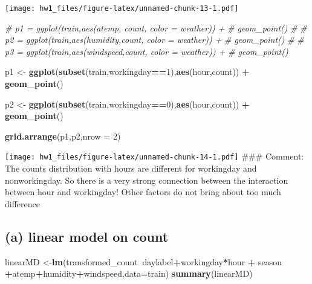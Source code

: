 \documentclass[]{article}
\newenvironment{Shaded}{\begin{snugshade}}{\end{snugshade}}
\newcommand{\KeywordTok}[1]{\textcolor[rgb]{0.13,0.29,0.53}{\textbf{#1}}}
\newcommand{\DataTypeTok}[1]{\textcolor[rgb]{0.13,0.29,0.53}{#1}}
\newcommand{\DecValTok}[1]{\textcolor[rgb]{0.00,0.00,0.81}{#1}}
\newcommand{\StringTok}[1]{\textcolor[rgb]{0.31,0.60,0.02}{#1}}
\newcommand{\CommentTok}[1]{\textcolor[rgb]{0.56,0.35,0.01}{\textit{#1}}}
\newcommand{\OperatorTok}[1]{\textcolor[rgb]{0.81,0.36,0.00}{\textbf{#1}}}
\newcommand{\NormalTok}[1]{#1}
\begin{document}
\texttt{[image: hw1\_files/figure-latex/unnamed-chunk-13-1.pdf]}

\begin{Shaded}
\begin{Highlighting}[]
\CommentTok{# p1 = ggplot(train,aes(atemp, count, color = weather)) + }
\CommentTok{#   geom_point()}
\CommentTok{# }
\CommentTok{# p2 = ggplot(train,aes(humidity,count,  color = weather)) + }
\CommentTok{#   geom_point()}
\CommentTok{# }
\CommentTok{# p3 = ggplot(train,aes(windspeed,count,  color = weather)) + }
\CommentTok{#   geom_point()}

\NormalTok{p1 <-}\StringTok{ }\KeywordTok{ggplot}\NormalTok{(}\KeywordTok{subset}\NormalTok{(train,workingday}\OperatorTok{==}\DecValTok{1}\NormalTok{),}\KeywordTok{aes}\NormalTok{(hour,count)) }\OperatorTok{+}\StringTok{ }
\StringTok{  }\KeywordTok{geom_point}\NormalTok{()}

\NormalTok{p2 <-}\StringTok{ }\KeywordTok{ggplot}\NormalTok{(}\KeywordTok{subset}\NormalTok{(train,workingday}\OperatorTok{==}\DecValTok{0}\NormalTok{),}\KeywordTok{aes}\NormalTok{(hour,count)) }\OperatorTok{+}\StringTok{ }
\StringTok{  }\KeywordTok{geom_point}\NormalTok{()}

\KeywordTok{grid.arrange}\NormalTok{(p1,p2,}\DataTypeTok{nrow =} \DecValTok{2}\NormalTok{)}
\end{Highlighting}
\end{Shaded}

\texttt{[image: hw1\_files/figure-latex/unnamed-chunk-14-1.pdf]} \#\#\#
Comment: The counts distribution with hours are different for workingday
and nonworkingday. So there is a very strong connection between the
interaction between hour and workingday! Other factors do not bring
about too much difference

\subsection{(a) linear model on count}\label{a-linear-model-on-count}

\begin{Shaded}
\begin{Highlighting}[]
\NormalTok{linearMD <-}\KeywordTok{lm}\NormalTok{(transformed_count}\OperatorTok{~}\NormalTok{daylabel}\OperatorTok{+}\NormalTok{workingday}\OperatorTok{*}\NormalTok{hour }\OperatorTok{+}\StringTok{ }\NormalTok{season }\OperatorTok{+}\NormalTok{atemp}\OperatorTok{+}\NormalTok{humidity}\OperatorTok{+}\NormalTok{windspeed,}\DataTypeTok{data=}\NormalTok{train)}
\KeywordTok{summary}\NormalTok{(linearMD)}
\end{Highlighting}
\end{Shaded}
\end{document}

